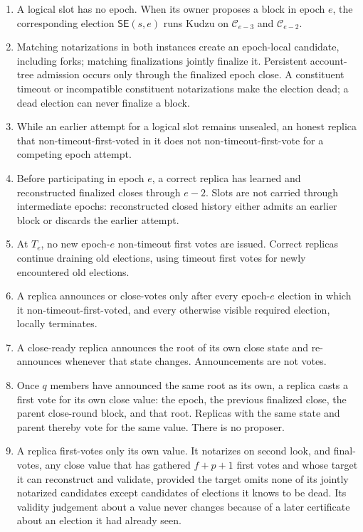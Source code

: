 \documentclass[11pt]{article}
\theoremstyle{remark}
\newcommand{\C}{\mathcal{C}}
\newcommand{\SE}{\mathsf{SE}}
\begin{document}
\begin{enumerate}[leftmargin=2.0em]
  \item A logical slot has no epoch. When its owner proposes a block in epoch $e$, the corresponding election $\SE(s,e)$ runs Kudzu on $\C_{e-3}$ and $\C_{e-2}$.

  \item Matching notarizations in both instances create an epoch-local candidate, including forks; matching finalizations jointly finalize it. Persistent account-tree admission occurs only through the finalized epoch close. A constituent timeout or incompatible constituent notarizations make the election dead; a dead election can never finalize a block.

  \item While an earlier attempt for a logical slot remains unsealed, an honest replica that non-timeout-first-voted in it does not non-timeout-first-vote for a competing epoch attempt.

  \item Before participating in epoch $e$, a correct replica has learned and reconstructed finalized closes through $e-2$. Slots are not carried through intermediate epochs: reconstructed closed history either admits an earlier block or discards the earlier attempt.

  \item At $T_e$, no new epoch-$e$ non-timeout first votes are issued. Correct replicas continue draining old elections, using timeout first votes for newly encountered old elections.

  \item A replica announces or close-votes only after every epoch-$e$ election in which it non-timeout-first-voted, and every otherwise visible required election, locally terminates.

  \item A close-ready replica announces the root of its own close state and re-announces whenever that state changes. Announcements are not votes.

  \item Once $q$ members have announced the same root as its own, a replica casts a first vote for its own close value: the epoch, the previous finalized close, the parent close-round block, and that root. Replicas with the same state and parent thereby vote for the same value. There is no proposer.

  \item A replica first-votes only its own value. It notarizes on second look, and final-votes, any close value that has gathered $f+p+1$ first votes and whose target it can reconstruct and validate, provided the target omits none of its jointly notarized candidates except candidates of elections it knows to be dead. Its validity judgement about a value never changes because of a later certificate about an election it had already seen.


\end{enumerate}
\end{document}
